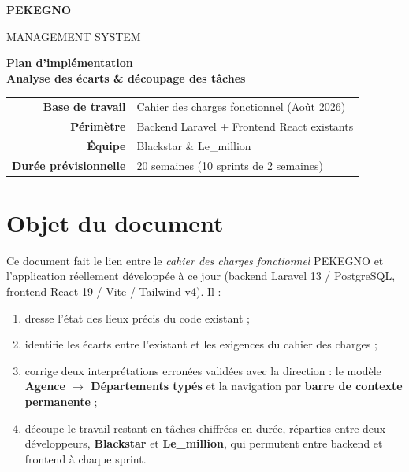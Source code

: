 \documentclass[11pt,a4paper]{article}
\begin{document}
\begin{titlepage}
  \centering
  \vspace*{2.5cm}
  {\Huge\bfseries PEKEGNO\par}
  \vspace{0.3cm}
  {\LARGE MANAGEMENT SYSTEM\par}
  \vspace{1.8cm}
  {\Large\bfseries Plan d'implémentation\\[0.3cm] Analyse des écarts \& découpage des tâches\par}
  \vspace{1.5cm}
  \begin{tabular}{rl}
    \textbf{Base de travail} & Cahier des charges fonctionnel (Août 2026) \\[2mm]
    \textbf{Périmètre} & Backend Laravel + Frontend React existants \\[2mm]
    \textbf{Équipe} & Blackstar \& Le\_million \\[2mm]
    \textbf{Durée prévisionnelle} & 20 semaines (10 sprints de 2 semaines) \\
  \end{tabular}
  \vfill
\end{titlepage}

\tableofcontents
\newpage

\section{Objet du document}

Ce document fait le lien entre le \emph{cahier des charges fonctionnel} PEKEGNO et l'application réellement développée à ce jour (backend Laravel 13 / PostgreSQL, frontend React 19 / Vite / Tailwind v4). Il :

\begin{enumerate}[nosep]
  \item dresse l'état des lieux précis du code existant ;
  \item identifie les écarts entre l'existant et les exigences du cahier des charges ;
  \item corrige deux interprétations erronées validées avec la direction : le modèle \textbf{Agence $\rightarrow$ Départements typés} et la navigation par \textbf{barre de contexte permanente} ;
  \item découpe le travail restant en tâches chiffrées en durée, réparties entre deux développeurs, \textbf{Blackstar} et \textbf{Le\_million}, qui permutent entre backend et frontend à chaque sprint.
\end{enumerate}
\end{document}
